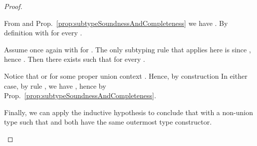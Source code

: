 \begin{proof}
\begin{itemize}
  From  and
  Prop.~\ref{prop:subtypeSoundnessAndCompleteness} we have . By definition 
  with  for every .
  
  Assume once again  with  for . The only subtyping rule that applies
  here is  since , hence . Then there exists
   such that  for every
  .

  Notice that  or  for
  some proper union context . Hence, by construction 
  In either case, by rule , we have , hence  by
  Prop.~\ref{prop:subtypeSoundnessAndCompleteness}.
  
  Finally, we can apply the inductive hypothesis to conclude that  with  a non-union type such that  and
  both have the same outermost type constructor. 
\end{itemize}
\end{proof}



